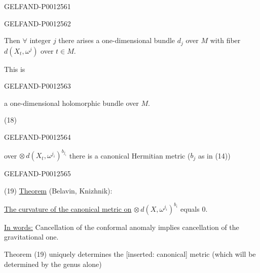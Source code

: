 \begin{GelfandAdjacentEvidence}{GELFAND-P001256}{1}
\end{GelfandAdjacentEvidence}
\begin{GelfandAdjacentEvidence}{GELFAND-P001256}{2}


Then $\forall$ integer $j$ there arises a one-dimensional bundle $d_j$ over $M$
with fiber $d(X_t,\omega^j)$ over $t\in M$.

This is
\end{GelfandAdjacentEvidence}
\begin{GelfandAdjacentEvidence}{GELFAND-P001256}{3}

a one-dimensional holomorphic bundle over $M$.

\noindent (18)
\end{GelfandAdjacentEvidence}
\begin{GelfandAdjacentEvidence}{GELFAND-P001256}{4}

over $\otimes\,d(X_t,\omega^{j_i})^{b_{j_i}}$ there is a canonical Hermitian metric
($b_j$ as in (14))
\end{GelfandAdjacentEvidence}
\begin{GelfandAdjacentEvidence}{GELFAND-P001256}{5}


\noindent (19) \underline{Theorem} (Belavin, Knizhnik):

\underline{The curvature of the canonical metric on} $\otimes\,d(X,\omega^{j_i})^{b_i}$ equals 0.

\underline{In words:} Cancellation of the conformal anomaly implies cancellation of the gravitational one.

Theorem (19) uniquely determines the [inserted: canonical] metric (which will be determined by the genus alone)
\end{GelfandAdjacentEvidence}
